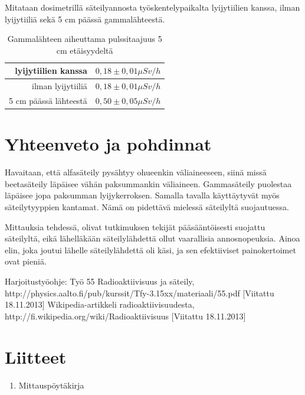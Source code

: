 \documentclass[a4paper,11pt]{article}
\begin{document}
Mitataan dosimetrillä säteilyannosta työskentelypaikalta lyijytiilien kanssa, ilman lyijytiiliä sekä 5 cm päässä gammalähteestä. 

\begin{table}[H]
\begin{center}
\caption{Gammalähteen aiheuttama pulssitaajuus 5 cm etäisyydeltä}
\begin{tabular}{ | r | l | }
  \hline
  lyijytiilien kanssa & $0,18 \pm 0,01 \mu Sv /h$ \\ \hline
  ilman lyijytiiliä & $0,18 \pm 0,01 \mu Sv /h$ \\ \hline
  5 cm päässä lähteestä & $0,50 \pm 0,05 \mu Sv /h$ \\ \hline
\end{tabular}
\end{center}
\end{table}

\clearpage

\section{Yhteenveto ja pohdinnat}

Havaitaan, että alfasäteily pysähtyy ohueenkin väliaineeseen, siinä missä beetasäteily läpäisee vähän paksummankin väliaineen. Gammasäteily puolestaa läpäisee jopa paksumman lyijykerroksen. Samalla tavalla käyttäytyvät myös säteilytyyppien kantamat. Nämä on pidettävä mielessä säteilyltä suojautuessa. 

Mittauksia tehdessä, olivat tutkimuksen tekijät pääsääntöisesti suojattu säteilyltä, eikä lähelläkään säteilylähdettä ollut vaarallisia annosnopeuksia. Ainoa elin, joka joutui lähelle säteilylähdettä oli käsi, ja sen efektiiviset painokertoimet ovat pieniä. 


\begin{thebibliography}{99}

 Harjoitustyöohje: Työ 55 Radioaktiivisuus ja säteily, http://physics.aalto.fi/pub/kurssit/Tfy-3.15xx/materiaali/55.pdf [Viitattu 18.11.2013]
 Wikipedia-artikkeli radioaktiivisuudesta, http://fi.wikipedia.org/wiki/Radioaktiivisuus [Viitattu 18.11.2013]

\end{thebibliography}

\section*{Liitteet}
\begin{enumerate}
\item{Mittauspöytäkirja}\label{mittaus}

\end{enumerate}
\end{document}
